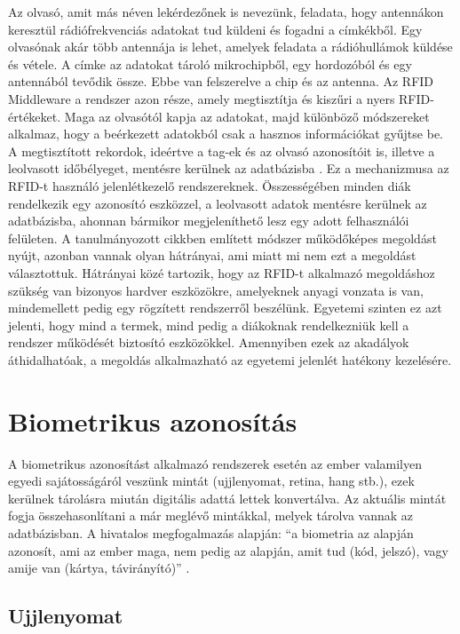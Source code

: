 Az olvasó, amit más néven lekérdezőnek is nevezünk, feladata, hogy antennákon keresztül rádiófrekvenciás adatokat tud küldeni és fogadni a címkékből. Egy olvasónak akár több antennája is lehet, amelyek feladata a rádióhullámok küldése és vétele. A címke az adatokat tároló mikrochipből, egy hordozóból és egy antennából tevődik össze. Ebbe van felszerelve a chip és az antenna. Az RFID Middleware a rendszer azon része, amely megtisztítja és kiszűri a nyers RFID-értékeket. Maga az olvasótól kapja az adatokat, majd különböző módszereket alkalmaz, hogy a beérkezett adatokból csak a hasznos információkat gyűjtse be. A megtisztított rekordok, ideértve a tag-ek és az olvasó azonosítóit is, illetve a leolvasott időbélyeget, mentésre kerülnek az adatbázisba \cite{1}. Ez a mechanizmusa az RFID-t használó jelenlétkezelő rendszereknek. Összességében minden diák rendelkezik egy azonosító eszközzel, a leolvasott adatok mentésre kerülnek az adatbázisba, ahonnan bármikor megjeleníthető lesz egy adott felhasználói felületen.
A tanulmányozott cikkben említett módszer működőképes megoldást nyújt, azonban vannak olyan hátrányai, ami miatt mi nem ezt a megoldást választottuk. Hátrányai közé tartozik, hogy az RFID-t alkalmazó megoldáshoz szükség van bizonyos hardver eszközökre, amelyeknek anyagi vonzata is van, mindemellett pedig egy rögzített rendszerről beszélünk. Egyetemi szinten ez azt jelenti, hogy mind a termek, mind pedig a diákoknak rendelkezniük kell a rendszer működését biztosító eszközökkel. Amennyiben ezek az akadályok áthidalhatóak, a megoldás alkalmazható az egyetemi jelenlét hatékony kezelésére.



\section{Biometrikus azonosítás}

A biometrikus azonosítást alkalmazó rendszerek esetén az ember valamilyen egyedi sajátosságáról veszünk mintát (ujjlenyomat, retina, hang stb.), ezek kerülnek tárolásra miután digitális adattá lettek konvertálva. Az aktuális mintát fogja összehasonlítani a már meglévő mintákkal, melyek tárolva vannak az adatbázisban.
A hivatalos megfogalmazás alapján: \enquote{a biometria az alapján azonosít, ami az ember maga, nem pedig az alapján, amit tud (kód, jelszó), vagy amije van (kártya, távirányító)} \cite{5}.

\subsection{Ujjlenyomat}

